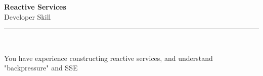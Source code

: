 \documentclass[11pt,a4paper]{memoir}
\begin{document}
    \begin{Spacing}{0.75}%
        \noindent
        \Large
        \textbf{Reactive Services}\\[3pt]
        \scriptsize\color{gray}Developer Skill\\ 
        \rule{\textwidth}{.3mm}\\
        
        \vspace{3mm}
        \noindent
        \begin{minipage}[t]{53mm}
            \begin{flushleft}
            {
                \normalsize
                \begin{Spacing}{1}%
                \color{black}\textrm{You have experience constructing reactive services, and understand "backpressure" and SSE}\\
                \end{Spacing}
            }
            \end{flushleft}
        \end{minipage}

        \vspace{5mm}
        \noindent
        \begin{minipage}[t]{53mm}
            \begin{flushleft}
            {
                \normalsize
                \begin{Spacing}{1}%
                \color{gray}\textit{}\\
                \end{Spacing}
            }
            \end{flushleft}
        \end{minipage}
    \end{Spacing}
    \clearpage
\end{document}
